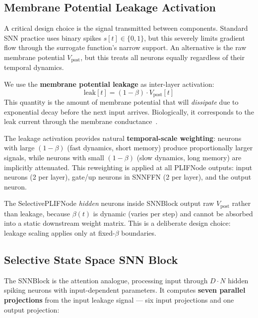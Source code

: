 \documentclass[10pt,twocolumn]{article}
\newcommand{\vpost}{V_{\text{post}}}
\begin{document}
\subsection{Membrane Potential Leakage Activation}
\label{sec:leakage}

A critical design choice is the signal transmitted between components.
Standard SNN practice uses binary spikes $s[t] \in \{0,1\}$, but this severely limits gradient flow through the surrogate function's narrow support.
An alternative is the raw membrane potential $\vpost$, but this treats all neurons equally regardless of their temporal dynamics.

We use the \textbf{membrane potential leakage} as inter-layer activation:
\begin{equation}
    \text{leak}[t] = (1 - \beta) \cdot \vpost[t]
    \label{eq:leakage}
\end{equation}
This quantity is the amount of membrane potential that will \emph{dissipate} due to exponential decay before the next input arrives.
Biologically, it corresponds to the leak current through the membrane conductance~\citep{hodgkin1952quantitative, abbott1999lapicque}.

The leakage activation provides natural \textbf{temporal-scale weighting}:
neurons with large $(1-\beta)$ (fast dynamics, short memory) produce proportionally larger signals,
while neurons with small $(1-\beta)$ (slow dynamics, long memory) are implicitly attenuated.
This reweighting is applied at all PLIFNode outputs: input neurons (2 per layer), gate/up neurons in SNNFFN (2 per layer), and the output neuron.

The SelectivePLIFNode \emph{hidden} neurons inside SNNBlock output raw $\vpost$ rather than leakage, because $\beta(t)$ is dynamic (varies per step) and cannot be absorbed into a static downstream weight matrix.
This is a deliberate design choice: leakage scaling applies only at fixed-$\beta$ boundaries.


\subsection{Selective State Space SNN Block}
\label{sec:snn-block}

The SNNBlock is the attention analogue, processing input through $D \cdot N$ hidden spiking neurons with input-dependent parameters.
It computes \textbf{seven parallel projections} from the input leakage signal --- six input projections and one output projection:
\end{document}
